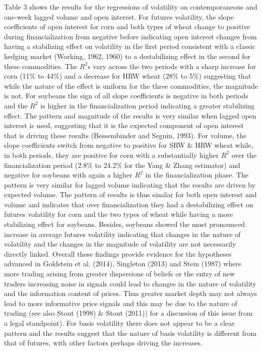 \documentclass[]{elsarticle} %
\begin{document}
Table 3 shows the results for the regressions of volatility on
contemporaneous and one-week lagged volume and open interest. For
futures volatility, the slope coefficients of open interest for corn and
both types of wheat change to positive during financialization from
negative before indicating open interest changes from having a
stabilizing effect on volatility in the first period consistent with a
classic hedging market (Working, 1962, 1960) to a destabilizing effect
in the second for these commodities. The \(R^{2}\)s vary across the two
periods with a sharp increase for corn (11\% to 44\%) and a decrease for
HRW wheat (28\% to 5\%) suggesting that while the nature of the effect
is uniform for the three commodities, the magnitude is not. For soybeans
the sign of all slope coefficients is negative in both periods and the
\(R^{2}\) is higher in the financialization period indicating a greater
stabilizing effect. The pattern and magnitude of the results is very
similar when lagged open interest is used, suggesting that it is the
expected component of open interest that is driving these results
(Bessembinder and Seguin, 1993). For volume, the slope coefficients
switch from negative to positive for SRW \& HRW wheat while, in both
periods, they are positive for corn with a substantially higher
\(R^{2}\) over the financialization period (2.8\% to 24.2\% for the Yang
\& Zhang estimator) and negative for soybeans with again a higher
\(R^{2}\) in the financialization phase. The pattern is very similar for
lagged volume indicating that the results are driven by expected volume.
The pattern of results is thus similar for both open interest and volume
and indicates that over financialization they had a destabilizing effect
on futures volatility for corn and the two types of wheat while having a
more stabilizing effect for soybeans. Besides, soybeans showed the most
pronounced increase in average futures volatility indicating that
changes in the nature of volatility and the changes in the magnitude of
volatility are not necessarily directly linked. Overall these findings
provide evidence for the hypotheses advanced in Goldstein et al. (2014),
Singleton (2013) and Stein (1987) where more trading arising from
greater dispersions of beliefs or the entry of new traders increasing
noise in signals could lead to changes in the nature of volatility and
the information content of prices. Thus greater market depth may not
always lead to more informative price signals and this may be due to the
nature of trading (see also Stout (1998) \& Stout (2011)) for a
discussion of this issue from a legal standpoint). For basis volatility
there does not appear to be a clear pattern and the results suggest that
the nature of basis volatility is different from that of futures, with
other factors perhaps driving the increases.
\end{document}
